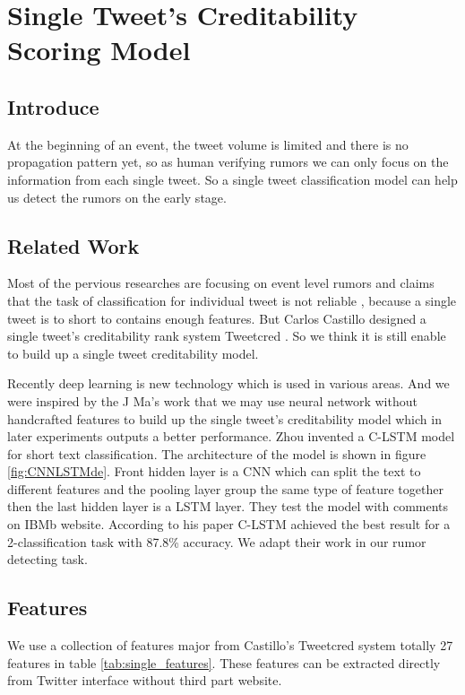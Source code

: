 
\chapter{Single Tweet's Creditability Scoring Model} %
\label{cha:single_tweet_creditbility_scoring_model}
\section{Introduce} %
At the beginning of an event, the tweet volume is limited and there is no propagation pattern yet, so as human verifying rumors we can only focus on the information from each single tweet. So a single tweet classification model can help us detect the rumors on the early stage. 


\section{Related Work} %

Most of the pervious researches are focusing on event level rumors and claims that the task of classification for individual tweet is not reliable \cite{liu2015real} \cite{ma2015detect} \cite{zhao2015enquiring}, because a single tweet is to short to contains enough features. But Carlos Castillo designed a single tweet's creditability rank system Tweetcred \cite{gupta2014tweetcred}. So we think it is still enable to build up a single tweet creditability model. 

Recently deep learning is new technology which is used in various areas. And we were inspired by the  J Ma's work \cite{lai2015recurrent} that we may use neural network without handcrafted features to build up the single tweet's creditability model which in later experiments outputs a better performance.  
   Zhou invented a C-LSTM model \cite{zhou2015c} for short text classification. The architecture of the model is shown in figure \ref{fig:CNNLSTMde}. Front hidden layer is a CNN which can split the text to different features and the pooling layer group the same type of feature together then the last hidden layer is a LSTM layer. They test the model with comments on IBMb website. According to his paper C-LSTM achieved the best result for a 2-classification task with 87.8\% accuracy. We adapt their work in our rumor detecting task.

  

\section{Features}
\label{featuressingle}
We use a collection of features major from  Castillo's Tweetcred system\cite{gupta2014tweetcred} totally 27 features in table \ref{tab:single_features}. These features can be extracted directly from Twitter interface without third part website. 
